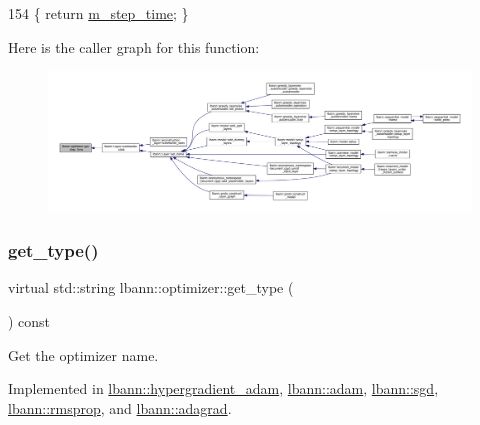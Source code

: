 \begin{DoxyCode}
154 \{ \textcolor{keywordflow}{return} \hyperlink{classlbann_1_1optimizer_afc424c715008fb4d900548f7934ea856}{m\_step\_time}; \}
\end{DoxyCode}
Here is the caller graph for this function\+:\nopagebreak
\begin{figure}[H]
\begin{center}
\leavevmode
\includegraphics[width=350pt]{classlbann_1_1optimizer_afef81d54e836ba0177f7a411ba3aaf6e_icgraph}
\end{center}
\end{figure}
\mbox{\label{classlbann_1_1optimizer_a7b7a6814e14eeee157e1cbb7f15dd4ff}} 
\subsubsection{\texorpdfstring{get\+\_\+type()}{get\_type()}}
{\footnotesize\ttfamily virtual std\+::string lbann\+::optimizer\+::get\+\_\+type (\begin{DoxyParamCaption}{ }\end{DoxyParamCaption}) const\hspace{0.3cm}{\ttfamily [pure virtual]}}

Get the optimizer name. 

Implemented in \hyperlink{classlbann_1_1hypergradient__adam_a21ba2e54a7c803c10ab8354d0552ba82}{lbann\+::hypergradient\+\_\+adam}, \hyperlink{classlbann_1_1adam_a091b61b0125d2da89d4029dd30ca1ce7}{lbann\+::adam}, \hyperlink{classlbann_1_1sgd_ad24efbeadae61890d07fa9e95aa91c61}{lbann\+::sgd}, \hyperlink{classlbann_1_1rmsprop_aa4299a19c0ab81a41ccebb9486f106b6}{lbann\+::rmsprop}, and \hyperlink{classlbann_1_1adagrad_a7a287b367af6ef6f7f21141ad78732a7}{lbann\+::adagrad}.

